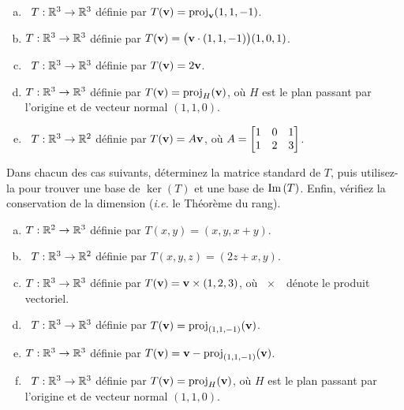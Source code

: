 \begin{prob}
\begin{enumerate}[a)]
\item\sov~$T:\mathbb{R}^3 \to \mathbb{R}^3$ d\'efinie par $T(\mathbf{v})= \operatorname{proj}_{\mathbf{v}}(1,1,-1)$.
\medskip
 
\item $T:\mathbb{R}^3 \to \mathbb{R}^3$ d\'efinie par $T(\mathbf{v})= \big(\mathbf{v} \cdot (1,1,-1)\big) (1,0,1)$.
\medskip
 
\item\sov~$T:\mathbb{R}^3 \to \mathbb{R}^3$ d\'efinie par $T(\mathbf{v})= 2 \mathbf{v}$.
\medskip
 
\item $T:\mathbb{R}^3 \to \mathbb{R}^3$ d\'efinie par $T(\mathbf{v})= \operatorname{proj}_H(\mathbf{v})$, où $H$ est le plan passant par l'origine et de vecteur normal $(1,1,0)$.
\medskip
 
\item\sov~$T:\mathbb{R}^3 \to \mathbb{R}^2$ d\'efinie par $T(\mathbf{v})= A\mathbf{v}$, où $A=\bmatrix 1&0&1\\ 1&2&3\endbmatrix$.
\medskip

\end{enumerate} 

\end{prob} \begin{prob} \label{prob24.2} Dans chacun des cas suivants, déterminez la matrice standard de $T$, puis utilisez-la pour trouver une base de $\ker( T)$ et une base de $\operatorname{Im}\,( T)$. Enfin, vérifiez la conservation de la dimension (\textit{i.e.} le Théorème du rang). 

\medskip
\begin{enumerate}[a)]
\item $T:\mathbb{R}^2 \to \mathbb{R}^3$ d\'efinie par $T(x,y)=(x, y, x+y)$.
\medskip
 
\item\sov~$T:\mathbb{R}^3 \to \mathbb{R}^2$ d\'efinie par $T(x,y,z)=(2 z+x, y)$.
\medskip
 
\item $T:\mathbb{R}^3 \to \mathbb{R}^3$ d\'efinie par $T(\mathbf{v})= \mathbf{v}\times (1,2,3)$, o\`u \og\  $\times$\ \fg\ d\'enote le produit vectoriel.
\medskip
 
\item\sov~$T:\mathbb{R}^3 \to \mathbb{R}^3$ d\'efinie par $T(\mathbf{v})= \operatorname{proj}_{(1,1,-1)}(\mathbf{v})$.
\medskip
 
\item $T:\mathbb{R}^3 \to \mathbb{R}^3$ d\'efinie par $T(\mathbf{v})= \mathbf{v}-\operatorname{proj}_{(1,1,-1)}(\mathbf{v})$.
\medskip
 
\item\sov~$T:\mathbb{R}^3 \to \mathbb{R}^3$ d\'efinie par $T(\mathbf{v})= \operatorname{proj}_H(\mathbf{v})$, où $H$ est le plan passant par l'origine et de vecteur normal $(1,1,0)$.
\medskip
 
\end{enumerate}


\end{prob}
